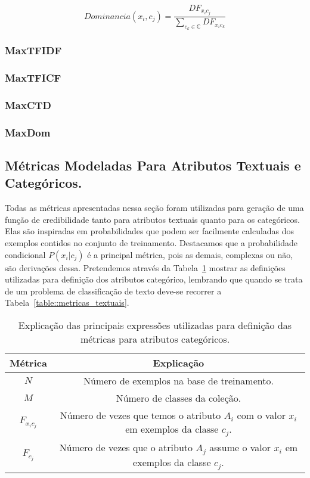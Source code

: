 \begin{equation}\label{eqn::dom}
   Dominancia(x_i, c_j) = \frac{ DF_{x_ic_j} } { \sum\limits_{c_k \in \mathbb{C}} DF_{ x_ic_k } } 
\end{equation}

\subsubsection{MaxTFIDF}
\label{subsubsection::maxtfidf}

\subsubsection{MaxTFICF} 
\label{subsubsection::maxtficf}

\subsubsection{MaxCTD}
\label{subsubsection::maxctd}

\subsubsection{MaxDom}
\label{subsubsection::maxdom}



\subsection{Métricas Modeladas Para Atributos Textuais e Categóricos.}
\label{subsec::pg_metricas_conteudo}


Todas as métricas apresentadas nessa seção foram utilizadas para geração de uma função de credibilidade tanto para atributos textuais quanto para os categóricos. Elas são inspiradas em probabilidades que podem ser facilmente calculadas dos exemplos contidos no conjunto de treinamento. Destacamos que a probabilidade condicional $P(x_i|c_j)$ é a principal métrica, pois as demais, complexas ou não, são derivações dessa. Pretendemos através da Tabela~\ref{table::metricas_textuais_categoricos} mostrar as definições utilizadas para definição dos atributos categórico, lembrando que quando se trata de um problema de classificação de texto deve-se recorrer a Tabela~\ref{table::metricas_textuais}.


\begin{table}[ht*]
\centering
\begin{tabular}{|c|c|}
\toprule
    \textbf{Métrica} & \textbf{Explicação} \\
\midrule
    $N$           & Número de exemplos na base de treinamento. \tabularnewline \hline
    $M$           & Número de classes da coleção. \tabularnewline \hline
    $F_{x_ic_j}$  & Número de vezes que temos o atributo $A_i$ com o valor $x_i$ em exemplos da classe $c_j$. \tabularnewline \hline
    $F_{c_j}$     & Número de vezes que o atributo $A_j$ assume o valor $x_i$ em exemplos da classe $c_j$. \tabularnewline 
\bottomrule
\end{tabular}
\caption{Explicação das principais expressões utilizadas para definição das métricas para atributos categóricos.}
\label{table::metricas_textuais_categoricos}
\end{table}

